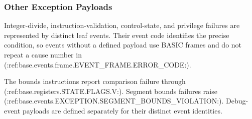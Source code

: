 \subsubsection{Other Exception Payloads}
Integer-divide, instruction-validation, control-state, and privilege failures are represented by distinct leaf events.
Their event code identifies the precise condition, so events without a defined payload use BASIC frames and do not
repeat a cause number in (:ref:base.events.frame.EVENT_FRAME.ERROR_CODE:).

The bounds instructions report comparison failure through (:ref:base.registers.STATE.FLAGS.V:). Segment bounds failures raise
(:ref:base.events.EXCEPTION.SEGMENT_BOUNDS_VIOLATION:). Debug-event payloads are defined separately for their distinct
event identities.
